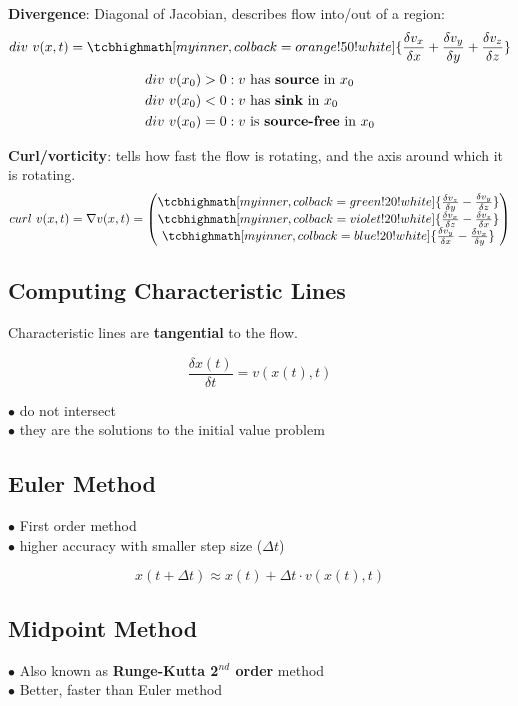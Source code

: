 \textbf{Divergence}: Diagonal of Jacobian, describes flow into/out of a region:
$$div\ v(x, t) = \tcbhighmath[myinner, colback=orange!50!white]{\frac{\delta v_x}{\delta x} + \frac{\delta v_y}{\delta y} + \frac{\delta v_z}{\delta z}}$$
\begin{align*}
    div\ v(x_0) > 0 & : v\text{ has \textbf{source} in } x_0     \\
    div\ v(x_0) < 0 & : v\text{ has \textbf{sink} in } x_0       \\
    div\ v(x_0) = 0 & : v\text{ is \textbf{source-free} in } x_0 \\
\end{align*}

\textbf{Curl/vorticity}: tells how fast the flow is rotating, and the axis around which it is rotating.
$$curl\ v(x, t) = \nabla v(x, t) = \begin{pmatrix}
        \tcbhighmath[myinner, colback=green!20!white]{\frac{\delta v_z}{\delta y} - \frac{\delta v_y}{\delta z}}  \\
        \tcbhighmath[myinner, colback=violet!20!white]{\frac{\delta v_x}{\delta z} - \frac{\delta v_z}{\delta x}} \\
        \tcbhighmath[myinner, colback=blue!20!white]{\frac{\delta v_y}{\delta x} - \frac{\delta v_x}{\delta y}}
    \end{pmatrix}$$

\subsection{Computing Characteristic Lines}
Characteristic lines are \textbf{tangential} to the flow.

$$\frac{\delta x(t)}{\delta t} = v(x(t), t)$$

$\bullet$ do not intersect \\
$\bullet$ they are the solutions to the initial value problem

\subsection{Euler Method}
$\bullet$ First order method \\
$\bullet$ higher accuracy with smaller step size ($\Delta t$)

$$x(t + \Delta t) \approx  x(t) + \Delta t \cdot v(x(t), t)$$

\subsection{Midpoint Method}
$\bullet$ Also known as \textbf{Runge-Kutta 2$^{nd}$ order} method \\
$\bullet$ Better, faster than Euler method

